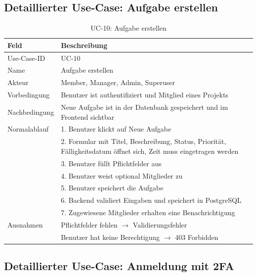 \subsection{Detaillierter Use-Case: Aufgabe erstellen}

\begin{table}[H]
    \centering
    \caption{UC-10: Aufgabe erstellen}
    \begin{tabularx}{\textwidth}{lX}
        \toprule
        \textbf{Feld} & \textbf{Beschreibung} \\
        \midrule
        Use-Case-ID   & UC-10 \\
        Name          & Aufgabe erstellen \\
        Akteur        & Member, Manager, Admin, Superuser \\
        Vorbedingung  & Benutzer ist authentifiziert und Mitglied
                        eines Projekts \\
        Nachbedingung & Neue Aufgabe ist in der Datenbank gespeichert
                        und im Frontend sichtbar \\
        Normalablauf  & 1. Benutzer klickt auf \glqq{}Neue Aufgabe\grqq{} \\
                      & 2. Formular mit Titel, Beschreibung, Status,
                           Priorität, Fälligkeitsdatum öffnet sich, Zeit muss eingetragen werden \\
                      & 3. Benutzer füllt Pflichtfelder aus \\
                      & 4. Benutzer weist optional Mitglieder zu \\
                      & 5. Benutzer speichert die Aufgabe \\
                      & 6. Backend validiert Eingaben und speichert
                           in PostgreSQL \\
                      & 7. Zugewiesene Mitglieder erhalten eine
                           Benachrichtigung \\
        Ausnahmen     & Pflichtfelder fehlen $\rightarrow$ Validierungsfehler \\
                      & Benutzer hat keine Berechtigung $\rightarrow$
                        403 Forbidden \\
        \bottomrule
    \end{tabularx}
    \label{tab:uc10}
\end{table}

\subsection{Detaillierter Use-Case: Anmeldung mit 2FA}

